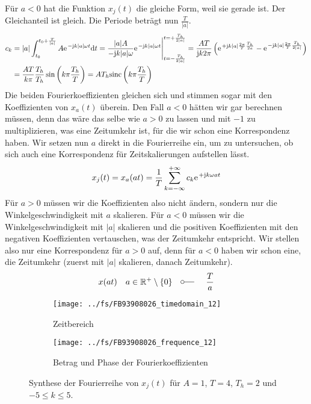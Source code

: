 \documentclass[11pt,a4paper,DIV=12]{scrartcl}
\newcommand{\sinc}{\mathrm{sinc}}
\begin{document}
%
%
Für $a<0$ hat die Funktion $x_{j}(t)$ die gleiche Form, weil sie gerade ist.
%
Der Gleichanteil ist gleich.
%
Die Periode beträgt nun $\frac{T}{|a|}$.
%
%
\begin{align}
	c_k&=|a|\int_{t_0}^{t_0+\frac{T}{|a|}}A\e^{-\im k |a|\omega t}\diff t
	=\frac{|a|A}{-\im k |a| \omega }\e^{-\im k |a| \omega t}\Bigg |_{t=-\frac{T_h}{2|a|}}^{t=+\frac{T_h}{2|a|}}
	=\frac{AT}{\im k 2\pi}\left (\e^{+\im k |a|\frac{2\pi}{T}\frac{T_h}{2a}}-\e^{-\im k |a|\frac{2\pi}{T}\frac{T_h}{2|a|}}\right )\nonumber\\
	&=\frac{AT}{k\pi}\frac{T_h}{T_h}\sin\left(k\pi\frac{T_h}{T}\right)=AT_h\sinc\left(k\pi\frac{T_h}{T}\right)
\end{align}
%
%
Die beiden Fourierkoeffizienten gleichen sich und stimmen sogar mit den
Koeffizienten von $x_{a}(t)$ überein.
%
Den Fall $a<0$ hätten wir gar berechnen müssen, denn das wäre das selbe wie
$a>0$ zu lassen und mit $-1$ zu multiplizieren, was eine Zeitumkehr ist,
für die wir schon eine Korrespondenz haben.
%
Wir setzen nun $a$ direkt in die Fourierreihe ein, um zu untersuchen,
ob sich auch eine Korrespondenz für Zeitskalierungen aufstellen lässt.
%
\begin{align}
	x_{j}(t)=x_{a}(at)=\frac{1}{T}\sum_{k=-\infty}^{+\infty}c_k\e^{+\im k \omega at}
\end{align}
%
Für $a>0$ müssen wir die Koeffizienten also nicht ändern, sondern nur die
Winkelgeschwindigkeit mit $a$ skalieren.
%
Für $a<0$ müssen wir die Winkelgeschwindigkeit mit $|a|$ skalieren und die
positiven Koeffizienten mit den negativen Koeffizienten vertauschen, was der
Zeitumkehr entspricht.
%
Wir stellen also nur eine Korrespondenz für $a>0$ auf, denn für $a<0$ haben wir
schon eine, die Zeitumkehr (zuerst mit $|a|$ skalieren, danach Zeitumkehr).
%
%
\begin{align}
	x(at)\quad a\in\mathbb{R}^+\setminus\{0\}\quad\fourier\quad \frac{T}{a}
\end{align}
%
%
\begin{figure}
	\centering
	\begin{subfigure}{\textwidth}
		\texttt{[image: ../fs/FB93908026\_timedomain\_12]}
		\caption{Zeitbereich}
	\end{subfigure}
	\begin{subfigure}{\textwidth}
		\texttt{[image: ../fs/FB93908026\_frequence\_12]}
		\caption{Betrag und Phase der Fourierkoeffizienten}
	\end{subfigure}
	\caption{Synthese der Fourierreihe von $x_j(t)$ für $A=1$, $T=4$, $T_h=2$ und
		$-5\leq k\leq5$.}
\end{figure}
%
\newpage
\end{document}
